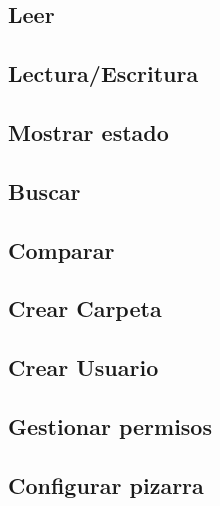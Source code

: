 \subsection{Leer}
\subsection{Lectura/Escritura}
\subsection{Mostrar estado}
\subsection{Buscar}
\subsection{Comparar}
\subsection{Crear Carpeta}
\subsection{Crear Usuario}
\subsection{Gestionar permisos}
\subsection{Configurar pizarra}

